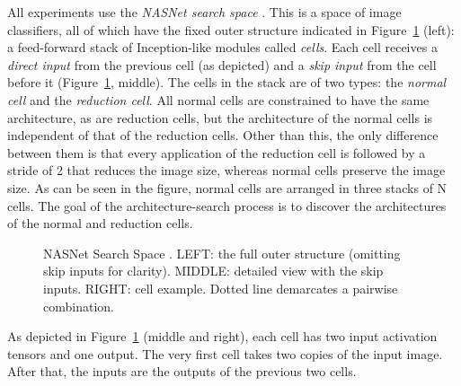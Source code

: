 \documentclass[letterpaper]{article} \usepackage{aaai19}  \usepackage{times}  \usepackage{helvet}  \usepackage{courier}  \usepackage{graphicx}  \frenchspacing
\begin{document}
All experiments use the \textit{NASNet search space} \cite{zoph2017learning}. This is a space of image classifiers, all of which have the fixed outer structure indicated in Figure~\ref{search_space_fig} (left): a feed-forward stack of Inception-like modules called \textit{cells}. Each cell receives a \textit{direct input} from the previous cell (as depicted) and a \textit{skip input} from the cell before it (Figure~\ref{search_space_fig}, middle). The cells in the stack are of two types: the \textit{normal cell} and the \textit{reduction cell}. All normal cells are constrained to have the same architecture, as are reduction cells, but the architecture of the normal cells is independent of that of the reduction cells. Other than this, the only difference between them is that every application of the reduction cell is followed by a stride of 2 that reduces the image size, whereas normal cells preserve the image size. As can be seen in the figure, normal cells are arranged in three stacks of N cells. The goal of the architecture-search process is to discover the architectures of the normal and reduction cells.

\begin{figure}[ht]
\centering
{}
\hspace{0.02\linewidth}
\hspace{0.05\linewidth}
\caption{NASNet Search Space \cite{zoph2017learning}. LEFT: the full outer structure (omitting skip inputs for clarity). MIDDLE: detailed view with the skip inputs. RIGHT: cell example. Dotted line demarcates a pairwise combination.}
\label{search_space_fig}
\end{figure}

As depicted in Figure~\ref{search_space_fig} (middle and right), each cell has two input activation tensors and one output. The very first cell takes two copies of the input image. After that, the inputs are the outputs of the previous two cells.
\end{document}
